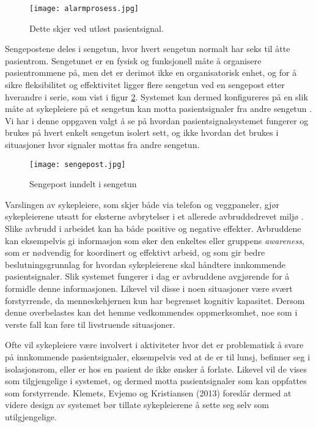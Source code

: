 \begin{figure}[H]
\centering
\texttt{[image: alarmprosess.jpg]}
\caption{Dette skjer ved utløst pasientsignal.}
\label{fig:detteskjer}
\end{figure}

\noindent
Sengepostene deles i sengetun, hvor hvert sengetun normalt har seks til åtte pasientrom. Sengetunet er en fysisk og funksjonell måte å organisere pasientrommene på, men det er derimot ikke en organisatorisk enhet, og for å sikre fleksibilitet og effektivitet ligger flere sengetun ved en sengepost etter hverandre i serie, som vist i figur \ref{fig:sengepost}. Systemet kan dermed konfigureres på en slik måte at sykepleiere på et sengetun kan motta pasientsignaler fra andre sengetun \cite{Aslaksen}. Vi har i denne oppgaven valgt å se på hvordan pasientsignalsystemet fungerer og brukes på hvert enkelt sengetun isolert sett, og ikke hvordan det brukes i situasjoner hvor signaler mottas fra andre sengetun.

\begin{figure}[H]
\centering
\texttt{[image: sengepost.jpg]}
\caption{Sengepost inndelt i sengetun \cite{Aslaksen}}
\label{fig:sengepost}
\end{figure}

\noindent
Varslingen av sykepleiere, som skjer både via telefon og veggpaneler, gjør sykepleierene utsatt for eksterne avbrytelser i et allerede avbruddsdrevet miljø \cite{Klemets12}. Slike avbrudd i arbeidet kan ha både positive og negative effekter. Avbruddene kan eksempelvis gi informasjon som øker den enkeltes eller gruppens \emph{awareness}, som er nødvendig for koordinert og effektivt arbeid, og som gir bedre beslutningsgrunnlag for hvordan sykepleierene skal håndtere innkommende pasientsignaler. Slik systemet fungerer i dag er avbruddene avgjørende for å formidle denne informasjonen. Likevel vil disse i noen situasjoner være svært forstyrrende, da menneskehjernen kun har begrenset kognitiv kapasitet. Dersom denne overbelastes kan det hemme vedkommendes oppmerksomhet, noe som i verste fall kan føre til livstruende situasjoner. 

\noindent
Ofte vil sykepleiere være involvert i aktiviteter hvor det er problematisk å svare på innkommende pasientsignaler, eksempelvis ved at de er til lunsj, befinner seg i isolasjonsrom, eller er hos en pasient de ikke ønsker å forlate. Likevel vil de vises som tilgjengelige i systemet, og dermed motta pasientsignaler som kan oppfattes som forstyrrende. Klemets, Evjemo og Kristiansen (2013) foreslår dermed at videre design av systemet bør tillate sykepleierene å sette seg selv som utilgjengelige. 

